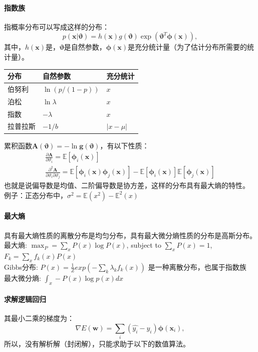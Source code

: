 \paragraph{指数族} 指概率分布可以写成这样的分布：
$$p(\bm x|\bm \vartheta) = h(\bm x)g(\bm\vartheta)\exp(\bm\vartheta^T\bm\phi(\bm x)),$$
其中，$h(\bm x)$是，$\bm\vartheta$是自然参数，$\bm\phi(\bm x)$是充分统计量（为了估计分布所需要的统计量）。

\begin{table}[H]
\centering
\begin{tabular}{lll}
    \toprule
    分布 & 自然参数 & 充分统计 \\
    \midrule
    伯努利 & $\ln(p/(1-p))$ & $x$ \\
    泊松 & $\ln\lambda$ & $x$ \\
    指数 & $-\lambda$ & $x$ \\
    拉普拉斯 & $-1/b$ & $|x-\mu|$ \\
    \bottomrule
\end{tabular}
\end{table}
累积函数$\bm A(\bm\vartheta) = - \ln \bm g(\bm \vartheta)$，有以下性质：
$$
\begin{array}{l}
    \frac{\partial\bm A}{\partial \vartheta_i} = \mathbb{E}[\bm\phi_i(\bm x)] \\
    \frac{\partial^2\bm A}{\partial \vartheta_i\partial \vartheta_j} = \mathbb{E}[\bm\phi_i(\bm x)\bm\phi_j(\bm x)] - \mathbb{E}[\bm\phi_i(\bm x)]\mathbb{E}[\bm\phi_j(\bm x)]
\end{array}
$$
也就是说偏导数是均值、二阶偏导数是协方差，这样的分布具有最大熵的特性。
例子：正态分布中，$\sigma^2=\mathbb{E}(x^2)-\mathbb{E}^2(x)$

\paragraph{最大熵}
具有最大熵性质的离散分布是均匀分布，具有最大微分熵性质的分布是高斯分布。\\
最大熵: $\max_P = \sum_x P(x)\log P(x)$, subject to $\sum_x P(x)=1$, $F_k=\sum_x f_k(x)P(x)$ \\
Gibbs分布: $P(x)=\frac{1}{Z}exp(-\sum_k \lambda_k f_k(x))$ 是一种离散分布，也属于指数族 \\
最大微分熵: $\int_x -P(x)\log p(x)dx$ 


\paragraph{求解逻辑回归} 其最小二乘的梯度为：
$$\nabla E(\bm w) = \sum_i (\hat{y_i} - y_i)\bm \phi(\bm x_i),$$
所以，没有解析解（封闭解），只能求助于以下的数值算法。

